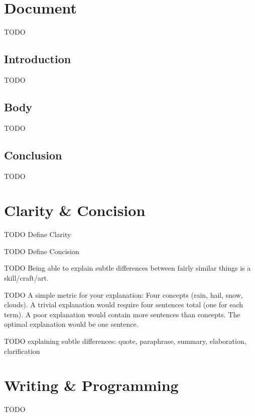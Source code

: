 \documentclass[10pt,a4paper]{book}
\begin{document}
\chapter{Document}

\color{BrickRed}TODO\color{black}


\section{Introduction}

\color{BrickRed}TODO\color{black}


\section{Body}

\color{BrickRed}TODO\color{black}


\section{Conclusion}

\color{BrickRed}TODO\color{black}



\chapter{Clarity \& Concision}

\color{BrickRed}TODO\color{black}
Define Clarity

\color{BrickRed}TODO\color{black}
Define Concision

\color{BrickRed}TODO\color{black}
Being able to explain subtle differences between fairly similar things is a skill/craft/art.

\color{BrickRed}TODO\color{black}
A simple metric for your explanation:
Four concepts (rain, hail, snow, clouds).
A trivial explanation would require four sentences total (one for each term).
A poor explanation would contain more sentences than concepts.
The optimal explanation would be one sentence.

\color{BrickRed}TODO\color{black}
explaining subtle differences: quote, paraphrase, summary, elaboration, clarification


\chapter{Writing \& Programming}

\color{BrickRed}TODO\color{black}
\end{document}
